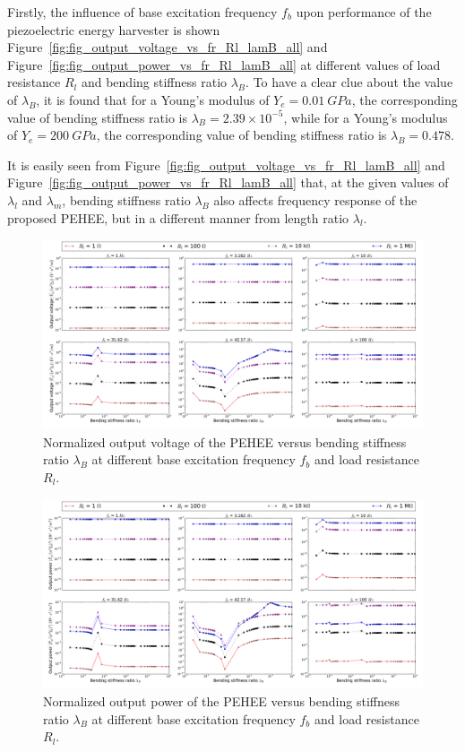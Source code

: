 \documentclass{elsarticle}
\begin{document}
Firstly, the influence of base excitation frequency $f_b$ upon performance of the piezoelectric energy harvester is shown Figure~\ref{fig:fig_output_voltage_vs_fr_Rl_lamB_all} and Figure~\ref{fig:fig_output_power_vs_fr_Rl_lamB_all} at different values of load resistance $R_l$ and bending stiffness ratio $\lambda_B$. To have a clear clue about the value of $\lambda_B$, it is found that for a Young's modulus of $Y_e = 0.01\ GPa$, the corresponding value of bending stiffness ratio is $\lambda_B = 2.39\times10^{-5}$, while for a Young's modulus of $Y_e = 200\ GPa$, the corresponding value of bending stiffness ratio is $\lambda_B = 0.478$.

It is easily seen from Figure~\ref{fig:fig_output_voltage_vs_fr_Rl_lamB_all} and Figure~\ref{fig:fig_output_power_vs_fr_Rl_lamB_all} that, at the given values of $\lambda_l$ and $\lambda_m$, bending stiffness ratio $\lambda_B$ also affects frequency response of the proposed PEHEE, but in a different manner from length ratio $\lambda_l$. 


\begin{figure}[!htbp]
    \centering
    \includegraphics[width=\textwidth]{./fig_vol_fr_sl_Rl_sl_vs_lamB}
    \caption{ Normalized output voltage of the PEHEE versus bending stiffness ratio $\lambda_B$ at different base excitation frequency $f_b$ and load resistance $R_l$. }
    \label{fig:fig_vol_fr_sl_Rl_sl_vs_lamB}
\end{figure}

\begin{figure}[!htbp]
    \centering
    \includegraphics[width=\textwidth]{./fig_pow_fr_sl_Rl_sl_vs_lamB}
    \caption{ Normalized output power of the PEHEE versus bending stiffness ratio $\lambda_B$ at different base excitation frequency $f_b$ and load resistance $R_l$. }
    \label{fig:fig_pow_fr_sl_Rl_sl_vs_lamB}
\end{figure}
\end{document}
